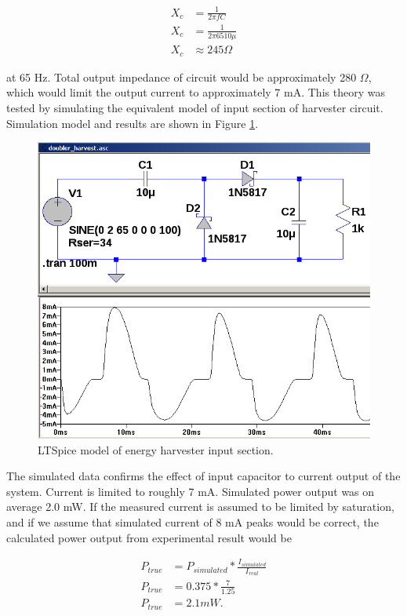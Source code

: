 \begin{equation}
\begin{split}
  X_c& = \frac{1}{2 \pi f C} \\
  X_c& = \frac{1}{2 \pi 65 10\mu} \\
  X_c& \approx 245 \Omega
\end{split}
\end{equation}

at 65 Hz. Total output impedance of circuit would be approximately 280 $\Omega$, which would limit the output current to approximately 7 mA. This theory was tested by simulating the equivalent model of input section of harvester circuit. Simulation model and results are shown in Figure \ref{fig:simulated_doubler}.

\begin{figure}[htb]
\begin{center}
\includegraphics[height=10cm]{images/own_dwg/simulation/voltage_doubler.png}
\end{center}
\caption{\label{fig:simulated_doubler} LTSpice model of energy harvester input section.}
\end{figure}

The simulated data confirms the effect of input capacitor to current output of the system. Current is limited to roughly 7 mA. Simulated power output was on average 2.0 mW. If the measured current is assumed to be limited by saturation, and if we assume that simulated current of 8 mA peaks would be correct, the calculated power output from experimental result would be 

\begin{equation}
\begin{split}
  P_{true}& = P_{simulated} * \frac{I_{simulated}}{I_{real}} \\
  P_{true}& = 0.375 * \frac{7}{1.25} \\
  P_{true}& = 2.1 mW. \\
\end{split}
\end{equation}

